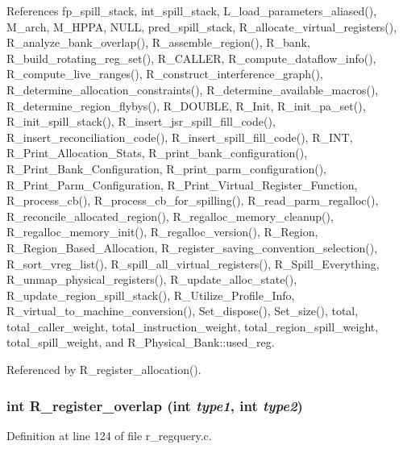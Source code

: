 References fp\_\-spill\_\-stack, int\_\-spill\_\-stack, L\_\-load\_\-parameters\_\-aliased(), M\_\-arch, M\_\-HPPA, NULL, pred\_\-spill\_\-stack, R\_\-allocate\_\-virtual\_\-registers(), R\_\-analyze\_\-bank\_\-overlap(), R\_\-assemble\_\-region(), R\_\-bank, R\_\-build\_\-rotating\_\-reg\_\-set(), R\_\-CALLER, R\_\-compute\_\-dataflow\_\-info(), R\_\-compute\_\-live\_\-ranges(), R\_\-construct\_\-interference\_\-graph(), R\_\-determine\_\-allocation\_\-constraints(), R\_\-determine\_\-available\_\-macros(), R\_\-determine\_\-region\_\-flybys(), R\_\-DOUBLE, R\_\-Init, R\_\-init\_\-pa\_\-set(), R\_\-init\_\-spill\_\-stack(), R\_\-insert\_\-jsr\_\-spill\_\-fill\_\-code(), R\_\-insert\_\-reconciliation\_\-code(), R\_\-insert\_\-spill\_\-fill\_\-code(), R\_\-INT, R\_\-Print\_\-Allocation\_\-Stats, R\_\-print\_\-bank\_\-configuration(), R\_\-Print\_\-Bank\_\-Configuration, R\_\-print\_\-parm\_\-configuration(), R\_\-Print\_\-Parm\_\-Configuration, R\_\-Print\_\-Virtual\_\-Register\_\-Function, R\_\-process\_\-cb(), R\_\-process\_\-cb\_\-for\_\-spilling(), R\_\-read\_\-parm\_\-regalloc(), R\_\-reconcile\_\-allocated\_\-region(), R\_\-regalloc\_\-memory\_\-cleanup(), R\_\-regalloc\_\-memory\_\-init(), R\_\-regalloc\_\-version(), R\_\-Region, R\_\-Region\_\-Based\_\-Allocation, R\_\-register\_\-saving\_\-convention\_\-selection(), R\_\-sort\_\-vreg\_\-list(), R\_\-spill\_\-all\_\-virtual\_\-registers(), R\_\-Spill\_\-Everything, R\_\-unmap\_\-physical\_\-registers(), R\_\-update\_\-alloc\_\-state(), R\_\-update\_\-region\_\-spill\_\-stack(), R\_\-Utilize\_\-Profile\_\-Info, R\_\-virtual\_\-to\_\-machine\_\-conversion(), Set\_\-dispose(), Set\_\-size(), total, total\_\-caller\_\-weight, total\_\-instruction\_\-weight, total\_\-region\_\-spill\_\-weight, total\_\-spill\_\-weight, and R\_\-Physical\_\-Bank::used\_\-reg.

Referenced by R\_\-register\_\-allocation().
\subsubsection{\setlength{\rightskip}{0pt plus 5cm}int R\_\-register\_\-overlap (int {\em type1}, int {\em type2})}\label{r__regproto_8h_11b01187580a0bd6bf0ba564f5656f78}




Definition at line 124 of file r\_\-regquery.c.

